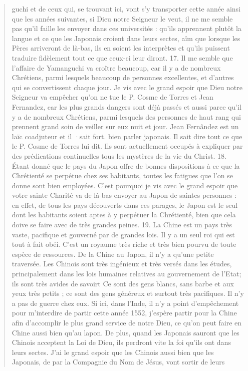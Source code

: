 \begin{quote}
    guchi et de ceux qui, se trouvant ici, vont s'y transporter cette
année ainsi que les années suivantes, si Dieu notre Seigneur le veut,
il ne me semble pas qu'il faille les envoyer dans ces universités :
qu'ils apprennent plutôt la langue et ce que les Japonais croient
dans leurs sectes, aîm que lorsque les Pères arriveront de là-bas,
ils en soient les interprètes et qu'ils puissent traduire fidèlement tout
ce que ceux-ci leur diront.
17. Il me semble que l'affaire de Yamanguchi va croître beaucoup,
car il y a de nombreux Chrétiens, parmi lesquels beaucoup
de personnes excellentes, et d'autres qui se convertissent chaque
jour. Je vis avec le grand espoir que Dieu notre Seigneur va empêcher
qu'on ne tue le P. Cosme de Torres et Jean Fernandez, car
les plus grands dangers sont déjà passés et aussi parce qu'il y a de
nombreux Chrétiens, parmi lesquels des personnes de haut rang qui
prennent grand soin de veiller sur eux nuit et jour. Jean Fernândez
est un laïc coadjuteur et il ·sait fort. bien parler japonais. Il sait
dire tout ce que le P. Cosme de Torres lui dit. Ils sont actuellement
occupés à expliquer par des prédications continuelles tous les
mystères de la vie du Christ.
18. Étant donné que le pays du Japon offre de bonnes dispositions
à ce que la Chrétienté se perpétue chez ses habitants, toutes
les fatigues que l'on se donne sont bien employées. C'est pourquoi
je vis avec le grand espoir que votre sainte Charité va de là-bas
envoyer au Japon de saintes personnes : en effet, de tous les pays
découverts dans ces parages, le Japon est le seul dont les habitants
soient aptes à y perpétuer la Chrétienté, bien que cela doive se faire
avec de très grandes peines.
19. La Chine est un pays très vaste, pacifique et gouverné par
de grandes lois. Il y a un seul roi qui est tout à fait obéi. C'est un
royaume très riche et très bien pourvu de toute espèce de ressources.
De la Chine au Japon, il n'y a qu'une petite traversée. Les Chinois
sont très ingénieux et très versés dans les études, principalement
dans les lois humaines relatives au gouvernement de l'Etat;
ils sont très avides de savoirt Ce sont des gens blancs, sans barbe
et aux yeux très petits ; ce sont des gens généreux et surtout très
pacifiques. Il n'y a pas de guerre chez eux. Si ici, dans l'Inde, il
n'y a point d'empêchement pour m'interdire de partir cette année
1552, j'espère partir pour la Chine afin d'accomplir le plus grand
service de notre Dieu, ce qu'on peut faire en Chine aussi bien qu'au
lapon. De plus, quand les Japonais sauront que les Chinois acceptent
la Loi de Dieu, ils perdront vite la foi qu'ils ont dans leurs sectes.
J'ai le grand espoir que les Chinois aussi bien que les Japonais,
de par la Compagnie du Nom de Jésus, vont sortir de leurs
\end{quote}

